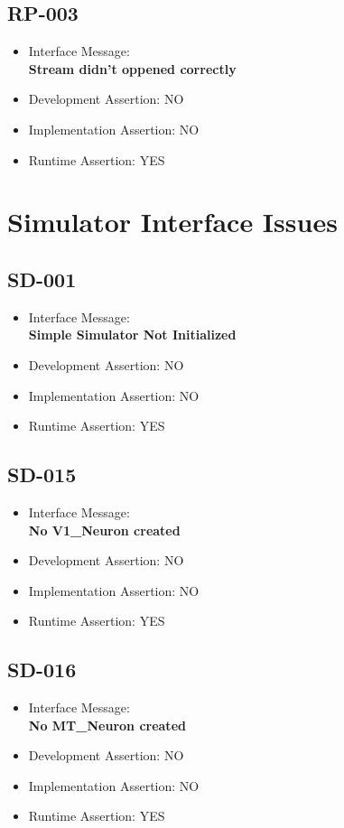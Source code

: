 \subsection{RP-003}
\begin{itemize}
  \item Interface Message:\\[1em]\textbf{Stream didn't oppened correctly}
  \item Development Assertion: NO
  \item Implementation Assertion: NO
  \item Runtime Assertion: YES
\end{itemize}

\section{Simulator Interface Issues}

\subsection{SD-001}
\begin{itemize}
  \item Interface Message:\\[1em]\textbf{Simple Simulator Not Initialized}
  \item Development Assertion: NO
  \item Implementation Assertion: NO
  \item Runtime Assertion: YES
\end{itemize}

\subsection{SD-015}
\begin{itemize}
  \item Interface Message:\\[1em]\textbf{No V1\_Neuron created}
  \item Development Assertion: NO
  \item Implementation Assertion: NO
  \item Runtime Assertion: YES
\end{itemize}

\subsection{SD-016}
\begin{itemize}
  \item Interface Message:\\[1em]\textbf{No MT\_Neuron created}
  \item Development Assertion: NO
  \item Implementation Assertion: NO
  \item Runtime Assertion: YES
\end{itemize}

